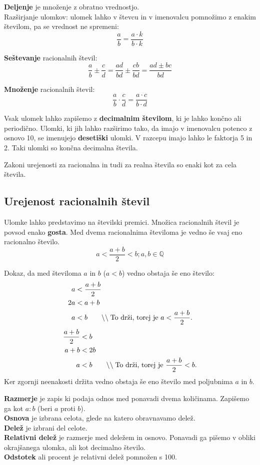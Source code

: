 \documentclass[a4paper,oneside,12pt,fleqn]{article}
\def\Q{\ensuremath{\mathbb Q}}
\newcommand\krat\cdot
\newcommand{\comment}[1]{\ensuremath{\qquad\backslash\backslash\;}\textnormal{#1}}
\numberwithin{equation}{section}
\begin{document}
\textbf{Deljenje} je množenje z obratno vrednostjo. \\
Razširjanje ulomkov: ulomek lahko v števcu in v imenovalcu pomnožimo z enakim številom, pa
se vrednost ne spremeni:
\[ \frac{a}{b} = \frac{a \krat k}{b \krat k} \]

\textbf{Seštevanje} racionalnih števil: 
\[ \frac{a}{b} \pm \frac{c}{d} = \frac{ad}{bd} \pm \frac{cb}{bd} = \frac{ad \pm bc}{bd} \]

\textbf{Množenje} racionalnih števil:
\[ \frac{a}{b} \krat \frac{c}{d} = \frac{a \krat c}{b \krat d} \]

Vsak ulomek lahko zapišemo z \textbf{decimalnim številom}, ki je lahko končno ali periodično.
Ulomki, ki jih lahko razširimo tako, da imajo v imenovalcu potenco z osnovo 10, se
imenujejo \textbf{desetiški} ulomki. V razcepu imajo lahko le faktorja 5 in 2. Taki ulomki so končna 
decimalna števila.

Zakoni urejenosti za racionalna in tudi za realna števila so enaki kot za cela števila.

\subsection{Urejenost racionalnih števil}
Ulomke lahko predstavimo na številski premici. Množica racionalnih števil je povsod enako
\textbf{gosta}. Med dvema racionalnima številoma je vedno še vsaj eno racionalno število.
\[ a < \frac{a+b}{2} < b; a, b \in \Q \] 

Dokaz, da med številoma $a$ in $b$ ($a < b$) vedno obstaja še eno število:
\begin{align*}
  a &< \frac{a+b}{2} \\
  2a &< a+b \\
  a &< b \comment{To drži, torej je $a < \frac{a+b}{2}$.}
\end{align*}
\begin{align*}
  \frac{a+b}{2} &< b \\
  a+b &< 2b \\
  a &< b \comment{To drži, torej je $\frac{a+b}{2} < b$.}
\end{align*}
Ker zgornji neenakosti držita vedno obstaja še eno število med poljubnima $a$ in $b$.

\textbf{Razmerje} je zapis ki podaja odnos med ponavadi dvema količinama. Zapišemo ga kot $a:b$
(beri $a$ proti $b$). \\
\textbf{Osnova} je izbrana celota, glede na katero obravnavamo delež. \\
\textbf{Delež} je izbrani del celote. \\
\textbf{Relativni delež} je razmerje med deležem in osnovo. Ponavadi ga pišemo v obliki okrajšanega
ulomka, ali kot decimalno število. \\
\textbf{Odstotek} ali procent je relativni delež pomnožen s 100.
\end{document}
